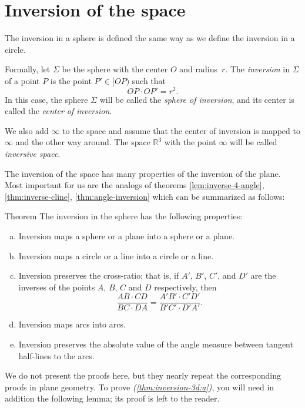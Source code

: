 \section[Inversion]{Inversion of the space}

The inversion in a sphere is defined the same way as we define the inversion in a circle.

Formally, let $\Sigma$ be the sphere with the center $O$ and radius~$r$.
The \emph{inversion} in $\Sigma$ of a point $P$ is the point $P'\in[OP)$ such that
$$OP\cdot OP'=r^2.$$
In this case, the sphere $\Sigma$  will be called the 
\emph{sphere of inversion},
and its center is called the \emph{center of inversion}.

We also add $\infty$ to the space and assume that the center of inversion is mapped to $\infty$ and the other way around. 
The space $\mathbb{R}^3$ with the point $\infty$ will be called \emph{inversive space}.

The inversion of the space 
has many properties 
of the inversion of the plane.
Most important for us are the analogs of theorems \ref{lem:inverse-4-angle}, \ref{thm:inverse-cline}, \ref{thm:angle-inversion} which can be summarized as follows:

\begin{thm}{Theorem}\label{thm:inversion-3d}
The inversion in the sphere has the following properties:
\begin{enumerate}[(a)]
\item\label{thm:inversion-3d:a} Inversion maps a sphere or a plane into a sphere or a plane.
\item\label{thm:inversion-3d:b} Inversion maps a circle or a line into a circle or a line. 
\item\label{thm:inversion-3d:cross-ratio} Inversion preserves the cross-ratio;
that is, if $A'$, $B'$, $C'$, and $D'$ are the inverses of the points $A$, $B$, $C$ and $D$ respectively,
then
$$\frac{AB\cdot CD}{BC\cdot DA}= \frac{A'B'\cdot C'D'}{B'C'\cdot D'A'}.$$
\item Inversion maps arcs into arcs.
\item\label{thm:inversion-3d:angle} Inversion preserves the absolute value of the angle
measure between tangent half-lines to the arcs.
\end{enumerate}
\end{thm}


We do not present the proofs here, but
they nearly repeat the corresponding proofs in plane geometry.
To prove \textit{(\ref{thm:inversion-3d:a})}, you will need in addition the following lemma;
its proof is left to the reader.

